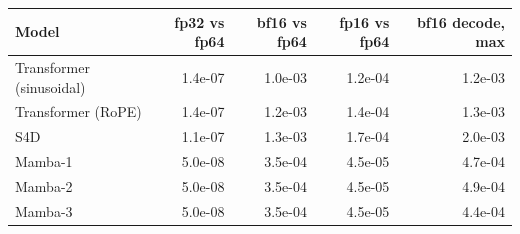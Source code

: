 \begin{tabular}{lrrrr}
\toprule
Model & fp32 vs fp64 & bf16 vs fp64 & fp16 vs fp64 & bf16 decode, max \\
\midrule
Transformer (sinusoidal) & 1.4e-07 & 1.0e-03 & 1.2e-04 & 1.2e-03 \\
Transformer (RoPE) & 1.4e-07 & 1.2e-03 & 1.4e-04 & 1.3e-03 \\
S4D & 1.1e-07 & 1.3e-03 & 1.7e-04 & 2.0e-03 \\
Mamba-1 & 5.0e-08 & 3.5e-04 & 4.5e-05 & 4.7e-04 \\
Mamba-2 & 5.0e-08 & 3.5e-04 & 4.5e-05 & 4.9e-04 \\
Mamba-3 & 5.0e-08 & 3.5e-04 & 4.5e-05 & 4.4e-04 \\
\bottomrule
\end{tabular}
\par{}

